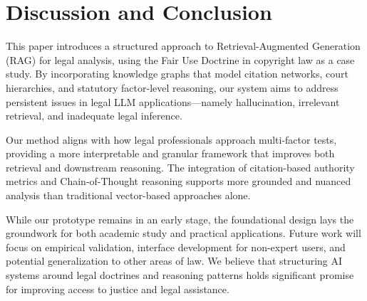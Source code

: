 \section{Discussion and Conclusion}

This paper introduces a structured approach to Retrieval-Augmented Generation (RAG) for legal analysis, using the Fair Use Doctrine in copyright law as a case study. By incorporating knowledge graphs that model citation networks, court hierarchies, and statutory factor-level reasoning, our system aims to address persistent issues in legal LLM applications—namely hallucination, irrelevant retrieval, and inadequate legal inference.

Our method aligns with how legal professionals approach multi-factor tests, providing a more interpretable and granular framework that improves both retrieval and downstream reasoning. The integration of citation-based authority metrics and Chain-of-Thought reasoning supports more grounded and nuanced analysis than traditional vector-based approaches alone.

While our prototype remains in an early stage, the foundational design lays the groundwork for both academic study and practical applications. Future work will focus on empirical validation, interface development for non-expert users, and potential generalization to other areas of law. We believe that structuring AI systems around legal doctrines and reasoning patterns holds significant promise for improving access to justice and legal assistance.